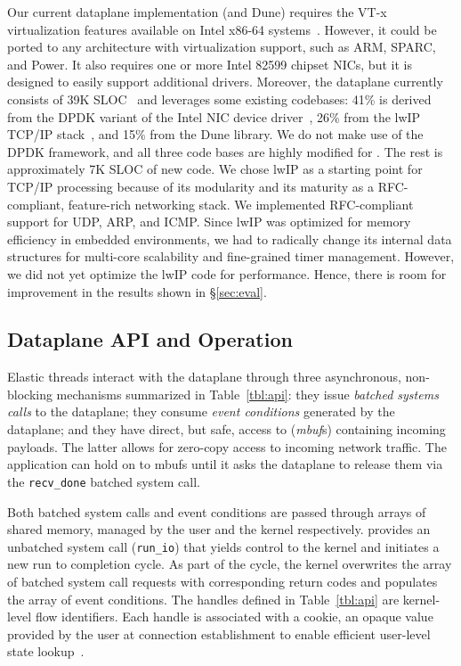Our current \ix dataplane implementation (and Dune) requires
the VT-x virtualization features available on Intel x86-64
systems~\cite{DBLP:journals/computer/UhligNRSMABKLS05}. However, it
could be ported to any architecture with virtualization support, such as
ARM, SPARC, and Power. It also requires one or more Intel 82599 chipset NICs,
but it is designed to easily support additional drivers.
Moreover, the \ix dataplane currently consists of 39K
SLOC~\cite{url:sloccount} and leverages some existing codebases:
41\% is derived from
the DPDK variant of the Intel NIC device driver~\cite{intel:dpdk},
26\% from the lwIP TCP/IP stack~\cite{dunkels2001design},
and 15\% from the Dune library.  We do not make use of the DPDK
framework, and all three code bases are
highly modified for \ix. The rest is approximately 7K SLOC
of new code. We chose lwIP as a starting point for TCP/IP processing
because of its modularity and its maturity as a RFC-compliant,
feature-rich networking stack. We implemented RFC-compliant support
for UDP, ARP, and ICMP.  Since lwIP was optimized for memory
efficiency in embedded environments, we had to radically change its
internal data structures for multi-core scalability and fine-grained
timer management. However, we did not yet optimize the lwIP code for
performance. Hence, there is room for improvement in the results shown
in \S\ref{sec:eval}.

\subsection{Dataplane API and Operation}
\label{sec:impl:api}

Elastic threads interact with the \ix dataplane through three
asynchronous, non-blocking mechanisms summarized in
Table~\ref{tbl:api}: they issue \emph{batched systems calls} to the
dataplane; they consume \emph{event conditions} generated by the
dataplane; and they have direct, but safe, access to (\emph{mbuf}s)
containing incoming payloads.  The latter allows for zero-copy access
to incoming network traffic.  The application can hold on to mbufs
until it asks the dataplane to release them via the
\texttt{recv\_done} batched system call.

Both batched system calls and event conditions are passed through
arrays of shared memory, managed by the user and the kernel
respectively.  \ix provides an unbatched system call
(\texttt{run\_io}) that yields control to the kernel and initiates a
new run to completion cycle. As part of the cycle, the kernel
overwrites the array of batched system call requests with
corresponding return codes and populates the array of event
conditions.  The handles defined in Table~\ref{tbl:api} are
kernel-level flow identifiers. Each handle is associated with a
cookie, an opaque value provided by the user at connection
establishment to enable efficient user-level state
lookup~\cite{DBLP:conf/osdi/HanMCR12}. %

